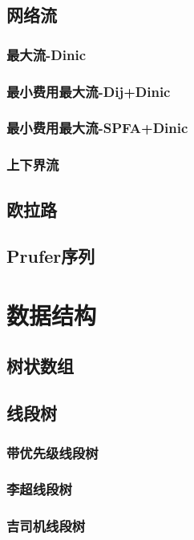 \documentclass[twocolumn,a4]{article}
\newcommand{\addcpp}[1]{}
\begin{document}
	\subsection{网络流}
		\subsubsection{最大流-Dinic}
			\addcpp{graph/MF_dinic}
		\subsubsection{最小费用最大流-Dij+Dinic} %
			\addcpp{graph/MSMF_dij_dinic}
		\subsubsection{最小费用最大流-SPFA+Dinic}
			\addcpp{graph/MSMF_SPFA_dinic}
		\subsubsection{上下界流}
	\subsection{欧拉路}
		\addcpp{graph/euler_path}
	\subsection{Prufer序列}

\section{数据结构}
	\subsection{树状数组}
		\addcpp{datastruct/binary_index_tree}
	\subsection{线段树}
		\subsubsection{带优先级线段树}
		\subsubsection{李超线段树}
			\addcpp{datastruct/lichao_seg} %
		\subsubsection{吉司机线段树}
			\addcpp{datastruct/minSeg}
\end{document}
